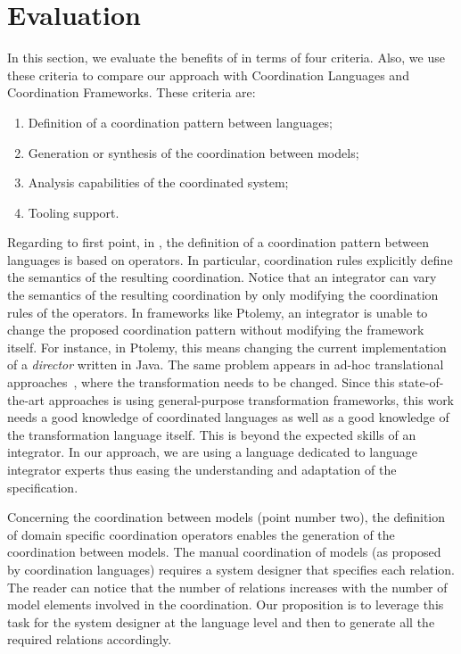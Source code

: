 \section{Evaluation}
\label{sec:evaluation}
In this section, we evaluate the benefits of  \bcool in terms of four criteria. Also, we use these criteria to compare our approach with Coordination Languages and Coordination Frameworks. These criteria are:
	\begin{enumerate}
		\item Definition of a coordination pattern between languages;
		\item Generation or synthesis of the coordination between models; 
		\item Analysis capabilities of the coordinated system;
		\item Tooling support.
	\end{enumerate}  

Regarding to first point, in \bcool, the definition of a coordination pattern between languages is based on operators. In particular, coordination rules explicitly define the semantics of the resulting coordination. Notice that an integrator can vary the semantics of the resulting coordination by only modifying the coordination rules of the operators. In frameworks like Ptolemy, an integrator is unable to change the proposed coordination pattern without modifying the framework itself. For instance, in Ptolemy, this means changing the current implementation of a \emph{director} written in Java. The same problem appears in ad-hoc translational approaches~\cite{dinatale}, where the transformation needs to be changed. Since this state-of-the-art approaches is using general-purpose transformation frameworks, this work needs a good knowledge of coordinated languages as well as a good knowledge of the transformation language itself. This is beyond the expected skills of an integrator. In our approach, we are using a language dedicated to language integrator experts thus easing the understanding and adaptation of the \bcool specification. 

Concerning the coordination between models (point number two), the definition of domain specific coordination operators enables the generation of the coordination between models. The manual coordination of models (as proposed by coordination languages) requires a system designer that specifies each relation. The reader can notice that the number of relations increases with the number of model elements involved in the coordination. Our proposition is to leverage this task for the system designer at the language level and then to generate all the required relations accordingly.

